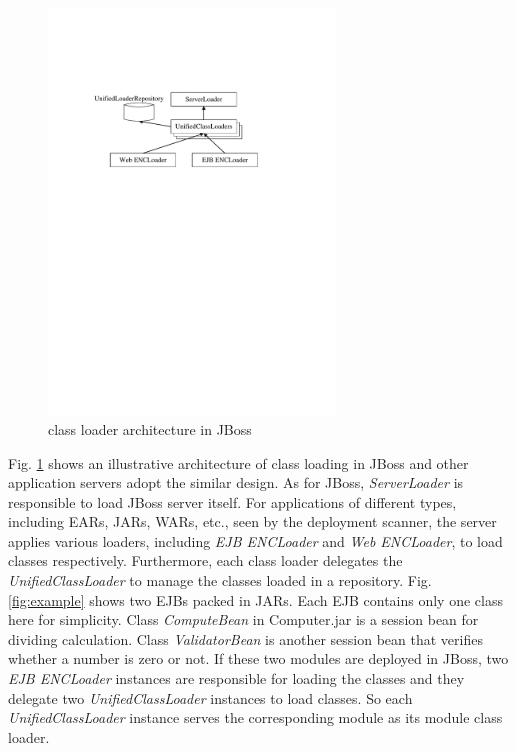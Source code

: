 \documentclass[conference]{IEEEtran}
\begin{document}
\begin{figure}[ht]
\centering
\includegraphics[width=3.0in]{JBossClassLoader.pdf}
\caption{class loader architecture in JBoss}
\label{fig:jboss_class_loader}
\end{figure}

Fig. \ref{fig:jboss_class_loader} shows an illustrative architecture of class loading in JBoss and other application servers adopt the similar design. As for JBoss, \emph{ServerLoader} is responsible to load JBoss server itself. For applications of different types, including EARs, JARs, WARs, etc., seen by the deployment scanner, the server applies various loaders, including \emph{EJB ENCLoader} and \emph{Web ENCLoader}, to load classes respectively. Furthermore, each class loader delegates the \emph{UnifiedClassLoader} to manage the classes loaded in a repository\cite{jboss_class_loader}. Fig. \ref{fig:example} shows two EJBs\cite{EJB} packed in JARs. Each EJB contains only one class here for simplicity. Class \emph{ComputeBean} in Computer.jar is a session bean for dividing calculation. Class \emph{ValidatorBean} is another session bean that verifies whether a number is zero or not. If these two modules are deployed in JBoss, two \emph{EJB ENCLoader} instances are responsible for loading the classes and they delegate two \emph{UnifiedClassLoader} instances to load classes. So each \emph{UnifiedClassLoader} instance serves the corresponding module as its module class loader.
\end{document}
